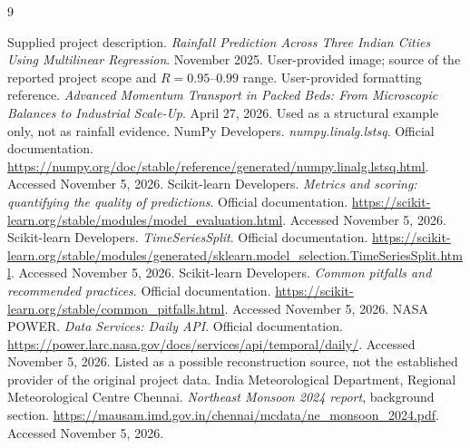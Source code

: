 \documentclass[11pt,a4paper]{article}
\begin{document}
\clearpage
\begin{thebibliography}{9}
 Supplied project description. \emph{Rainfall Prediction Across Three Indian Cities Using Multilinear Regression}. November 2025. User-provided image; source of the reported project scope and $R=0.95$--$0.99$ range.
 User-provided formatting reference. \emph{Advanced Momentum Transport in Packed Beds: From Microscopic Balances to Industrial Scale-Up}. April 27, 2026. Used as a structural example only, not as rainfall evidence.
 NumPy Developers. \emph{numpy.linalg.lstsq}. Official documentation. \url{https://numpy.org/doc/stable/reference/generated/numpy.linalg.lstsq.html}. Accessed November 5, 2026.
 Scikit-learn Developers. \emph{Metrics and scoring: quantifying the quality of predictions}. Official documentation. \url{https://scikit-learn.org/stable/modules/model_evaluation.html}. Accessed November 5, 2026.
 Scikit-learn Developers. \emph{TimeSeriesSplit}. Official documentation. \url{https://scikit-learn.org/stable/modules/generated/sklearn.model_selection.TimeSeriesSplit.html}. Accessed November 5, 2026.
 Scikit-learn Developers. \emph{Common pitfalls and recommended practices}. Official documentation. \url{https://scikit-learn.org/stable/common_pitfalls.html}. Accessed November 5, 2026.
 NASA POWER. \emph{Data Services: Daily API}. Official documentation. \url{https://power.larc.nasa.gov/docs/services/api/temporal/daily/}. Accessed November 5, 2026. Listed as a possible reconstruction source, not the established provider of the original project data.
 India Meteorological Department, Regional Meteorological Centre Chennai. \emph{Northeast Monsoon 2024 report}, background section. \url{https://mausam.imd.gov.in/chennai/mcdata/ne_monsoon_2024.pdf}. Accessed November 5, 2026.
\end{thebibliography}
\end{document}
